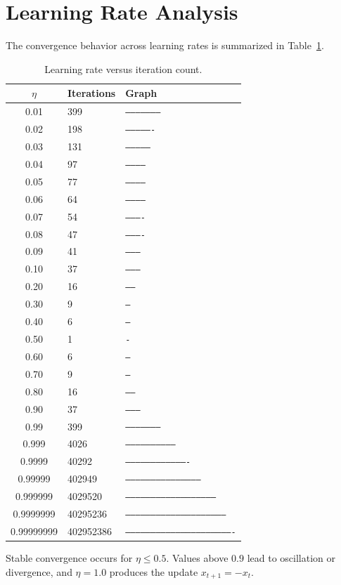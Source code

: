 \documentclass[conference]{IEEEtran}
\begin{document}
\section{Learning Rate Analysis}
The convergence behavior across learning rates is summarized in Table~\ref{tab:lr}.

\begin{table}[h]
\caption{Learning rate versus iteration count.}
\label{tab:lr}
\centering
\begin{tabular}{@{}cll@{}}
\toprule
$\eta$ & Iterations & Graph \\
\midrule
0.01 & 399 & \texttt{--------------------} \\
0.02 & 198 & \texttt{----------------} \\
0.03 & 131 & \texttt{---------------} \\
0.04 & 97 & \texttt{------------} \\
0.05 & 77 & \texttt{-----------} \\
0.06 & 64 & \texttt{-----------} \\
0.07 & 54 & \texttt{----------} \\
0.08 & 47 & \texttt{----------} \\
0.09 & 41 & \texttt{---------} \\
0.10 & 37 & \texttt{---------} \\
0.20 & 16 & \texttt{-----} \\
0.30 & 9 & \texttt{---} \\
0.40 & 6 & \texttt{--} \\
0.50 & 1 & \texttt{-} \\
0.60 & 6 & \texttt{--} \\
0.70 & 9 & \texttt{---} \\
0.80 & 16 & \texttt{-----} \\
0.90 & 37 & \texttt{---------} \\
0.99 & 399 & \texttt{--------------------} \\
0.999 & 4026 & \texttt{-----------------------------} \\
0.9999 & 40292 & \texttt{-------------------------------------} \\
0.99999 & 402949 & \texttt{--------------------------------------------} \\
0.999999 & 4029520 & \texttt{------------------------------------------------------} \\
0.9999999 & 40295236 & \texttt{------------------------------------------------------------} \\
0.99999999 & 402952386 & \texttt{----------------------------------------------------------------} \\
\bottomrule
\end{tabular}
\end{table}

Stable convergence occurs for $\eta\leq0.5$. Values above $0.9$ lead to oscillation or divergence, and $\eta=1.0$ produces the update $x_{t+1}=-x_{t}$.
\end{document}
